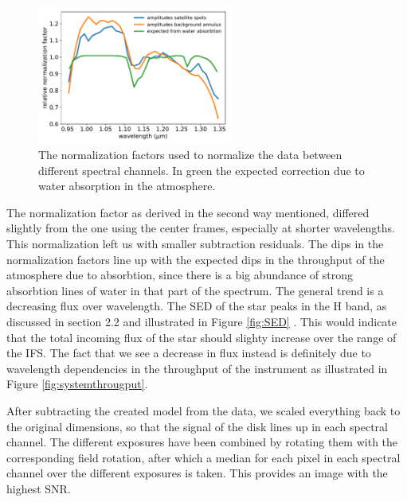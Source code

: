 \documentclass[twoside,single,12pt]{lion-msc}
\begin{document}
\begin{figure}
\centering
\includegraphics[width = 0.57\textwidth]{allnormalization}
\caption{The normalization factors used to normalize the data between different spectral channels. In green the expected correction due to water absorption in the atmosphere.}
\label{fig:throughputnorm}
\vspace{-5mm}
\end{figure}
The normalization factor as derived in the second way mentioned, differed slightly from the one using the center frames, especially at shorter wavelengths. This normalization left us with smaller subtraction residuals. The dips in the normalization factors line up with the expected dips in the throughput of the atmosphere due to absorbtion, since there is a big abundance of strong absorbtion lines of water in that part of the spectrum. The general trend is a decreasing flux over wavelength. The SED of the star peaks in the H band, as discussed in section 2.2 and illustrated in Figure \ref{fig:SED} \citep{Padgett2008}. This would indicate that the total incoming flux of the star should slighty increase over the range of the IFS. The fact that we see a decrease in flux instead is definitely due to wavelength dependencies in the throughput of the instrument as illustrated in Figure \ref{fig:systemthrougput}.
\bigskip

After subtracting the created model from the data, we scaled everything back to the original dimensions, so that the signal of the disk lines up in each spectral channel. The different exposures have been combined by rotating them with the corresponding field rotation, after which a median for each pixel in each spectral channel over the different exposures is taken. This provides an image with the highest SNR.
\end{document}
